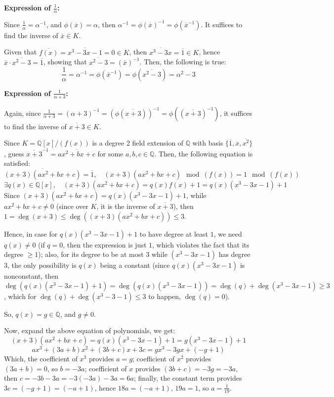 \documentclass{article}
\begin{document}
\hfil

\textbf{Expression of $\frac{1}{\alpha}$:}

Since $\frac{1}{\alpha}=\alpha^{-1}$, and $\phi(\overline{x})=\alpha$, then $\alpha^{-1}=\phi(\overline{x})^{-1}=\phi(\overline{x}^{-1})$. It suffices to find the inverse of $\overline{x}\in K$.

Given that $\overline{f(x)}=\overline{x^3-3x-1}=0\in K$, then $\overline{x^3-3x}=\overline{1}\in K$, hence $\overline{x}\cdot\overline{x^2-3}=\overline{1}$, showing that $\overline{x^2-3}=(\overline{x})^{-1}$. 
Then, the following is true:
$$\frac{1}{\alpha}=\alpha^{-1}=\phi(\overline{x}^{-1})=\phi(\overline{x^2-3})=\alpha^2-3$$

\hfil

\textbf{Expression of $\frac{1}{\alpha+3}$:}

Again, since $\frac{1}{\alpha+3}=(\alpha+3)^{-1}=(\phi(\overline{x+3}))^{-1}=\phi((\overline{x+3})^{-1})$, it suffices to find the inverse of $\overline{x+3}\in K$.

Since $K=\mathbb{Q}[x]/(f(x))$ is a degree 2 field extension of $\mathbb{Q}$ with basis $\{\overline{1},\overline{x},\overline{x^2}\}$, guess $\overline{x+3}^{-1}=\overline{ax^2+bx+c}$ for some $a,b,c\in\mathbb{Q}$.
Then, the following equation is satisfied:
$$\overline{(x+3)(ax^2+bx+c)}=\overline{1},\quad (x+3)(ax^2+bx+c)\mod (f(x))=1\mod (f(x))$$
$$\exists q(x)\in\mathbb{Q}[x],\quad (x+3)(ax^2+bx+c) = q(x)f(x)+1 = q(x)(x^3-3x-1)+1$$ 
Since $(x+3)(ax^2+bx+c)=q(x)(x^3-3x-1)+1$, while $ax^2+bx+c\neq 0$ (since over $K$, it is the inverse of $\overline{x+3}$), then $1=\deg(x+3)\leq \deg((x+3)(ax^2+bx+c))\leq 3$.

Hence, in case for $q(x)(x^3-3x-1)+1$ to have degree at least $1$, we need $q(x)\neq 0$ (if $q=0$, then the expression is just $1$, which violates the fact that its degree $\geq 1$); 
also, for its degree to be at most $3$ while $(x^3-3x-1)$ has degree $3$, the only possibility is $q(x)$ being a constant (since $q(x)(x^3-3x-1)$ is nonconstant, then $\deg(q(x)(x^3-3x-1)+1)=\deg(q(x)(x^3-3x-1))=\deg(q)+ \deg(x^3-3x-1)\geq 3$, which for $\deg(q)+\deg(x^3-3-1)\leq 3$ to happen, $\deg(q)=0$).

So, $q(x)=g\in \mathbb{Q}$, and $g\neq 0$.

Now, expand the above equation of polynomials, we get:
$$(x+3)(ax^2+bx+c)=q(x)(x^3-3x-1)+1=g(x^3-3x-1)+1$$
$$ax^3+(3a+b)x^2+(3b+c)x+3c = gx^3-3gx+(-g+1)$$
Which, the coefficient of $x^3$ provides $a=g$; coefficient of $x^2$ provides $(3a+b)=0$, so $b=-3a$; coefficient of $x$ provides $(3b+c)=-3g=-3a$, then $c=-3b-3a = -3(-3a)-3a=6a$;
finally, the constant term provides $3c=(-g+1)=(-a+1)$, hence $18a=(-a+1)$, $19a=1$, so $a=\frac{1}{19}$.
\end{document}
